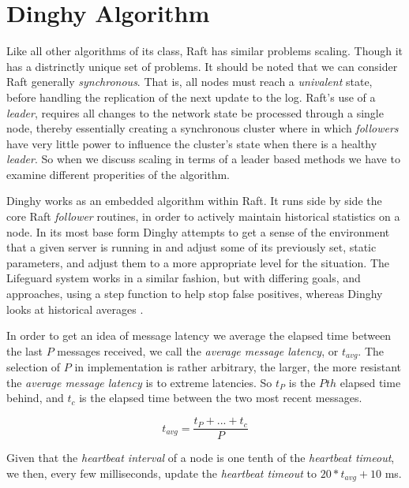 \section{Dinghy Algorithm}

Like all other algorithms of its class, Raft has similar problems scaling. Though it has a distrinctly unique set of problems. It should be noted that we can consider Raft generally \textit{synchronous}. That is, all nodes must reach a \textit{univalent} state, before handling the replication of the next update to the log. Raft's use of a \textit{leader}, requires all changes to the network state be processed through a single node, thereby essentially creating a synchronous cluster where in which \textit{followers} have very little power to influence the cluster's state when there is a healthy \textit{leader}. So when we discuss scaling in terms of a leader based methods we have to examine different properities of the algorithm.

Dinghy works as an embedded algorithm within Raft. It runs side by side the core Raft \textit{follower} routines, in order to actively maintain historical statistics on a node. In its most base form Dinghy attempts to get a sense of the environment that a given server is running in and adjust some of its previously set, static parameters, and adjust them to a more appropriate level for the situation. The Lifeguard system works in a similar fashion, but with differing goals, and approaches, using a step function to help stop false positives, whereas Dinghy looks at historical averages \cite{Lifeguard}.

In order to get an idea of message latency we average the elapsed time between the last $P$ messages received, we call the \textit{average message latency}, or $t_{avg}$. The selection of $P$ in implementation is rather arbitrary, the larger, the more resistant the \textit{average message latency} is to extreme latencies. So $t_{P}$ is the $Pth$ elapsed time behind, and $t_{c}$ is the elapsed time between the two most recent messages.

$$
t_{avg} = \frac{t_{P}+...+t_{c}}{P}
$$

Given that the \textit{heartbeat interval} of a node is one tenth of the \textit{heartbeat timeout}, we then, every few milliseconds, update the \textit{heartbeat timeout} to $20*t_{avg} + 10$ ms.
